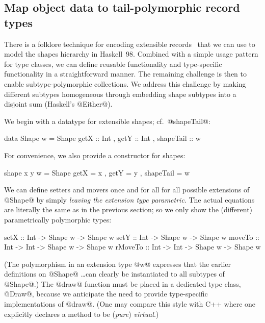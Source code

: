 \documentclass{jfp}
\begin{document}
\subsection{Map object data to tail-polymorphic record types}
\label{S:burton}

There is a folklore technique for encoding extensible
records~\cite{Burton90} that we can use to model the shapes hierarchy
in Haskell~98. Combined with a simple usage pattern for type classes,
we can define reusable functionality and type-specific functionality
in a straightforward manner. The remaining challenge is then to enable
subtype-polymorphic collections. We address this challenge by making
different subtypes homogeneous through embedding shape subtypes into a
disjoint sum (Haskell's @Either@).

We begin with a datatype for extensible shapes; cf.\ @shapeTail@:

\begin{code}
 data Shape w =
      Shape { getX :: Int
            , getY :: Int
            , shapeTail :: w }
\end{code}

For convenience, we also provide a constructor for shapes:

\begin{code}
 shape x y w = Shape { getX = x
                     , getY = y
                     , shapeTail = w }
\end{code}

We can define setters and movers once and for all for all possible
extensions of @Shape@ by simply \emph{leaving the extension type
parametric}. The actual equations are literally the same as in the
previous section; so we only show the (different) parametrically
polymorphic types:

\begin{code}
 setX :: Int -> Shape w -> Shape w
 setY :: Int -> Shape w -> Shape w
 moveTo :: Int -> Int -> Shape w -> Shape w
 rMoveTo :: Int -> Int -> Shape w -> Shape w
\end{code}

(The polymorphism in an extension type @w@ expresses that the earlier
definitions on @Shape@ \ldots can clearly be instantiated to all
subtypes of @Shape@.) The @draw@ function must be placed in a
dedicated type class, @Draw@, because we anticipate the need to
provide type-specific implementations of @draw@. (One may compare this
style with C++ where one explicitly declares a method to be
(\emph{pure}) \emph{virtual}.)
\end{document}

